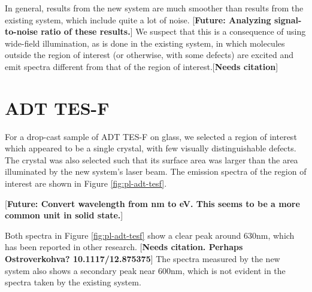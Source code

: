 In general, results from the new system are much smoother than results from the existing system, which include quite a lot of noise. [\textbf{Future: Analyzing signal-to-noise ratio of these results.}] We suspect that this is a consequence of using wide-field illumination, as is done in the existing system, in which molecules outside the region of interest (or otherwise, with some defects) are excited and emit spectra different from that of the region of interest.[\textbf{Needs citation}]

\section{ADT TES-F}

For a drop-cast sample of ADT TES-F on glass, we selected a region of interest which appeared to be a single crystal, with few visually distinguishable defects. The crystal was also selected such that its surface area was larger than the area illuminated by the new system's laser beam. The emission spectra of the region of interest are shown in Figure \ref{fig:pl-adt-tesf}.

[\textbf{Future: Convert wavelength from nm to eV. This seems to be a more common unit in solid state.}]

Both spectra in Figure \ref{fig:pl-adt-tesf} show a clear peak around 630nm, which has been reported in other research. [\textbf{Needs citation. Perhaps Ostroverkohva? 10.1117/12.875375}] The spectra measured by the new system also shows a secondary peak near 600nm, which is not evident in the spectra taken by the existing system.

